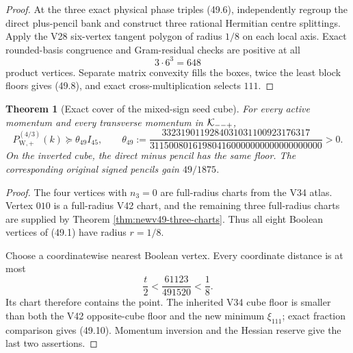 \documentclass[11pt,oneside]{article}
\newtheorem{theorem}{Theorem}[section]
\theoremstyle{definition}
\theoremstyle{remark}
\begin{document}
\begin{proof}
At the three exact physical phase triples (49.6), independently
regroup the direct plus-pencil bank and construct three rational
Hermitian centre splittings.  Apply the V28 six-vertex tangent
polygon of radius \(1/8\) on each local axis.  Exact rounded-basis
congruence and Gram-residual checks are positive at all
\[
 3\cdot6^3=648                                         \tag{49.9}
\]
product vertices.  Separate matrix convexity fills the boxes,
twice the least block floors gives (49.8), and exact
cross-multiplication selects \(111\).
\end{proof}

\begin{theorem}[Exact cover of the mixed-sign seed cube]
\label{thm:newv49-mixed-cube}
For every active momentum and every transverse momentum in
\({\cal K}_{--+}\),
\[
 P_{\mathrm W,+}^{(4/3)}(k)
 \succeq\theta_{49}I_{45},\qquad
 \theta_{49}:=
 \frac{3323190119284031031100923176317}
 {311500801619804160000000000000000000}>0.             \tag{49.10}
\]
On the inverted cube, the direct minus pencil has the same floor.
The corresponding original signed pencils gain \(49/1875\).
\end{theorem}

\begin{proof}
The four vertices with \(n_3=0\) are full-radius charts from the
V34 atlas.  Vertex \(010\) is a full-radius V42 chart, and the
remaining three full-radius charts are supplied by Theorem
\ref{thm:newv49-three-charts}.  Thus all eight Boolean vertices of
(49.1) have radius \(r=1/8\).

Choose a coordinatewise nearest Boolean vertex.  Every coordinate
distance is at most
\[
 \frac t2<\frac{61123}{491520}<\frac18.                \tag{49.11}
\]
Its chart therefore contains the point.  The inherited V34 cube
floor is smaller than both the V42 opposite-cube floor and the
new minimum \(\xi_{111}\); exact fraction comparison gives
(49.10).  Momentum inversion and the Hessian reserve give the last
two assertions.
\end{proof}
\end{document}
